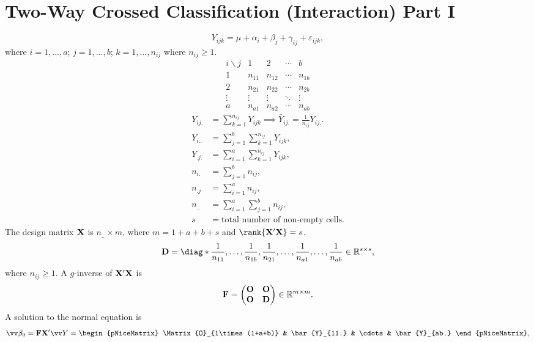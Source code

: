 \section*{Two-Way Crossed Classification (Interaction) Part I}
\[ Y_{ijk}=\mu+\alpha_i+\beta_j+\gamma_{ij}+\varepsilon_{ijk}, \]
where $ i=1,\ldots,a $; $ j=1,\ldots,b $;
$ k=1,\ldots,n_{ij} $ where $ n_{ij}\ge 1 $.
\[ \begin{array}{c|cccc}
        i\backslash j & 1      & 2      & \cdots & b      \\
        \hline
        1             & n_{11} & n_{12} & \cdots & n_{1b} \\
        2             & n_{21} & n_{22} & \cdots & n_{2b} \\
        \vdots        & \vdots & \vdots & \ddots & \vdots \\
        a             & n_{a1} & n_{a2} & \cdots & n_{ab}
    \end{array} \]
\begin{align*}
    Y_{ij.} & =\sum_{k=1}^{n_{ij}}Y_{ijk}\implies \bar{Y}_{ij.}=\frac{1}{n_{ij}}Y_{ij.}. \\
    Y_{i..} & =\sum_{j=1}^{b}\sum_{k=1}^{n_{ij}}Y_{ijk},                                 \\
    Y_{.j.} & =\sum_{i=1}^{a}\sum_{k=1}^{n_{ij}}Y_{ijk},                                 \\
    n_{i.}  & =\sum_{j=1}^{b}n_{ij},                                                     \\
    n_{.j}  & =\sum_{i=1}^{a}n_{ij},                                                     \\
    n_{..}  & =\sum_{i=1}^{a}\sum_{j=1}^{b}n_{ij},                                       \\
    s       & =\text{total number of non-empty cells}.
\end{align*}
The design matrix $ \mathbf{X} $ is $ n_{..}\times m $,
where $ m=1+a+b+s $ and $ \rank{\Matrix{X}'\Matrix{X}}=s $.
\[ \Matrix{D}=\diag*{\frac{1}{n_{11}},\ldots,\frac{1}{n_{1b}},\frac{1}{n_{21}},\ldots,\frac{1}{n_{a1}},\ldots,\frac{1}{n_{ab}}}\in\R^{s\times s}, \]
where $ n_{ij}\ge 1 $. A $ g $-inverse of $ \mathbf{X}'\mathbf{X} $ is
\[ \mathbf{F}=\begin{pmatrix}
        \mathbf{O} & \mathbf{O} \\
        \mathbf{O} & \mathbf{D}
    \end{pmatrix}\in\mathbb{R}^{m\times m}. \]
A solution to the normal equation is
\[ \Vector{\beta}_0=\Matrix{F}\Matrix{X}'\Vector{Y}=\begin{pNiceMatrix}
        \Matrix{O}_{1\times(1+a+b)} & \bar{Y}_{11.} & \cdots & \bar{Y}_{ab.}
    \end{pNiceMatrix}, \]
